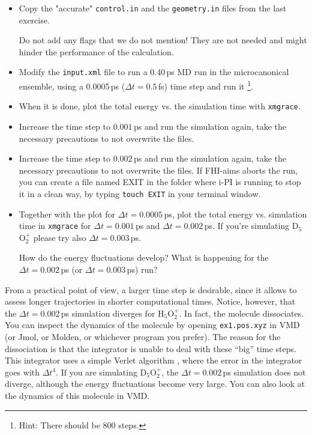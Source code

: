 \documentclass[a4paper,11pt]{scrartcl}
\begin{document}
\begin{itemize}

\item Copy the "accurate" \texttt{control.in}  and  the \texttt{geometry.in} files from the last exercise.

Do not add any flags that we do not mention! They are not needed and might hinder the performance of the calculation.

\item Modify the \texttt{input.xml} file to run  a 0.40\,ps MD run in the microcanonical ensemble, using a 0.0005\,ps ($\Delta t = 0.5\,$fs) time step and run it \footnote{Hint: There should be 800 steps.}. 

\item When it is done, plot the total energy  vs. the simulation time  with \texttt{xmgrace}.

\item Increase the time step to $0.001\,$ps and run the simulation again, take the necessary precautions to not overwrite the files.

\item Increase the time step to $0.002\,$ps and run the simulation again, take the necessary precautions to not overwrite the files. If FHI-aims aborts the run,  you can create a file named EXIT in the folder where i-PI is running to stop it in a clean way, by typing \texttt{touch EXIT} in your terminal window.

\item Together with the plot for $\Delta t = 0.0005\,$ps, plot the total energy vs. simulation time in \texttt{xmgrace} for $\Delta t = 0.001\,$ps and $\Delta t = 0.002\,$ps. 
If you're simulating D$_5$O$_2^+$ please try also $\Delta t = 0.003\,$ps.

How do the energy fluctuations develop?
What is happening for the $\Delta t = 0.002\,$ps (or  $\Delta t = 0.003\,$ps) run?

\end{itemize}

From a practical point of view, a larger time step is desirable, since it allows to assess longer trajectories
in shorter computational times. Notice, however, that the $\Delta t = 0.002\,$ps simulation diverges for H$_5$O$_2^+$.
In fact, the molecule dissociates. You can inspect the dynamics of the molecule by opening \texttt{ex1.pos.xyz}  in VMD (or Jmol, or Molden, or whichever program you prefer). 
The reason for the dissociation is that the integrator is unable to deal with these ``big'' time steps.
This integrator uses a simple Verlet algorithm \cite{frenkel-smit}, where the error in the integrator goes with $\Delta t^4$.
If you are simulating D$_5$O$_2^+$, the $\Delta t = 0.002\,$ps simulation does not diverge, although the energy fluctuations become very large.
You can also look at the dynamics of this molecule in VMD.
\end{document}
